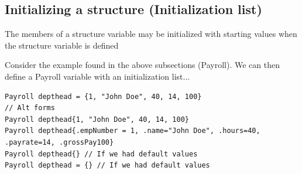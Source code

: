 \documentclass{report}
\begin{document}
	\bigbreak \noindent 
	\subsection{Initializing a structure (Initialization list)}
	\bigbreak \noindent 
	\begin{concept}
	   The members of a structure variable may be initialized with starting values when the structure variable is defined 
	\end{concept}
	\bigbreak \noindent 
	Consider the example found in the above subsections (Payroll). We can then define a Payroll variable with an initialization list...
	\bigbreak \noindent 
	\sepline
	\begin{verbatim}
Payroll depthead = {1, "John Doe", 40, 14, 100}
// Alt forms
Payroll depthead{1, "John Doe", 40, 14, 100} 
Payroll depthead{.empNumber = 1, .name="John Doe", .hours=40, .payrate=14, .grossPay100}
Payroll depthead{} // If we had default values
Payroll depthead = {} // If we had default values
	\end{verbatim}
	\sepline
	
	
	

    
    

    












    
\end{document}
